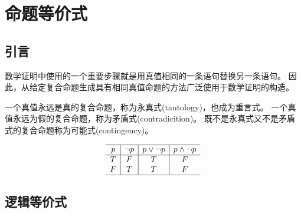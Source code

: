 
\section{命题等价式}
{
    \subsection{引言}
    {
        数学证明中使用的一个重要步骤就是用真值相同的一条语句替换另一条语句。
        因此，从给定复合命题生成具有相同真值命题的方法广泛使用于数学证明的构造。

        \begin{defines}
            一个真值永远是真的复合命题，称为永真式(tautology)，也成为重言式。
            一个真值永远为假的复合命题，称为矛盾式(contradicition)。
            既不是永真式又不是矛盾式的复合命题称为可能式(contingency)。
        \end{defines}

        \begin{table}[htb]
            \centering

            \[
                \begin{array}{c|c|c|c}
                    \hline
                    p & \neg p & p \vee \neg p & p \wedge \neg p \\
                    \hline
                    T & F & T & F \\
                    F & T & T & F \\
                    \hline
                \end{array}
            \]

            \caption{永真式和矛盾式的例子}
        \end{table}
    }

    \subsection{逻辑等价式}
    {
        \begin{wraptable}{r}{.3333\textwidth{}}
            \centering

            \[
                \begin{array}{c}
                    \hline
                    \neg (p \wedge q) \equiv \neg p \vee \neg q \\
                    \neg (p \vee q) \equiv \neg p \wedge \neg q \\
                    \hline
                \end{array}
            \]


\end{wraptable}}}
